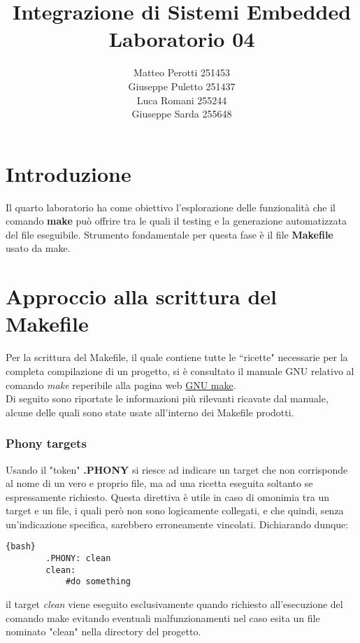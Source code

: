 \documentclass{article}
\title{Integrazione di Sistemi Embedded\\ Laboratorio 04}
\author{Matteo Perotti 251453\\ Giuseppe Puletto 251437\\ Luca Romani 255244\\ Giuseppe Sarda 255648}
\begin{document}
\maketitle

\newpage

\section{Introduzione}
	Il quarto laboratorio ha come obiettivo l'esplorazione delle funzionalità che il comando \textbf{make} può offrire tra le quali il testing e la generazione automatizzata del file eseguibile. Strumento fondamentale per questa fase è il file \textbf{Makefile} usato da make.

\section{Approccio alla scrittura del Makefile}
	Per la scrittura del Makefile, il quale contiene tutte le ``ricette" necessarie per la completa compilazione di un progetto, 
	si è consultato il manuale GNU relativo al comando  \textit{make} reperibile alla pagina web 
	\href{https://www.gnu.org/software/make/manual/make.html}{GNU make}.\\
	Di seguito sono riportate le informazioni più rilevanti ricavate dal manuale, alcune delle quali sono state usate 
	all'interno dei Makefile prodotti.

	\subsubsection*{Phony targets}
		Usando il "token" \textbf{.PHONY} si riesce ad indicare un target che non corrisponde al nome di un vero e proprio file, 
		ma ad una ricetta eseguita soltanto se espressamente richiesto. Questa direttiva è utile in caso di omonimia tra un target 
		e un file, %
		i quali però non sono logicamente collegati, e che quindi, senza un'indicazione specifica, sarebbero 
		erroneamente vincolati.
		Dichiarando dunque:
		\begin{lstlisting}{bash}
		.PHONY: clean
		clean:
			#do something
		\end{lstlisting}
		il target \textit{clean} viene eseguito esclusivamente quando richiesto all'esecuzione del comando make evitando eventuali malfunzionamenti nel caso esita un file nominato "clean" nella directory del progetto.
\end{document}
